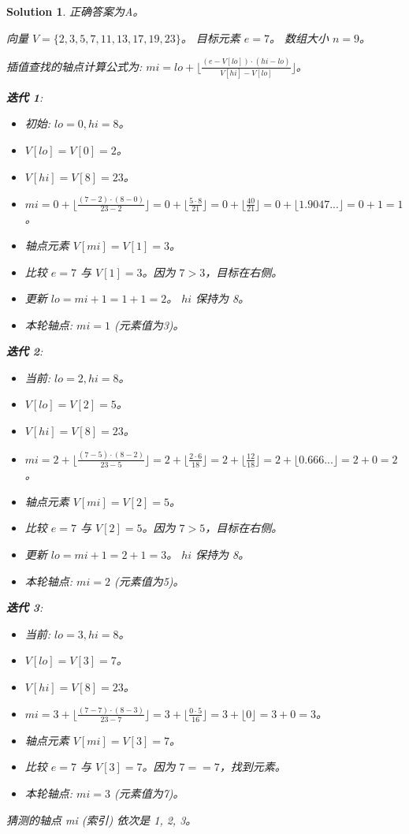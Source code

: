 \documentclass[UTF8]{report}
\newtheorem{solution}{Solution}
\theoremstyle{MyLineTheoremStyle} %
\theoremstyle{MyBlockTheoremStyle} %
\theoremstyle{MySubsubsectionStyle} %
\begin{document}
\begin{solution}
正确答案为A。

向量 $V = \{2, 3, 5, 7, 11, 13, 17, 19, 23\}$。
目标元素 $e = 7$。
数组大小 $n=9$。

插值查找的轴点计算公式为: $mi = lo + \lfloor \frac{(e - V[lo]) \cdot (hi - lo)}{V[hi] - V[lo]} \rfloor$。

\textbf{迭代 1}:
\begin{itemize}
    \item 初始: $lo = 0, hi = 8$。
    \item $V[lo] = V[0] = 2$。
    \item $V[hi] = V[8] = 23$。
    \item $mi = 0 + \lfloor \frac{(7 - 2) \cdot (8 - 0)}{23 - 2} \rfloor = 0 + \lfloor \frac{5 \cdot 8}{21} \rfloor = 0 + \lfloor \frac{40}{21} \rfloor = 0 + \lfloor 1.9047... \rfloor = 0 + 1 = 1$。
    \item 轴点元素 $V[mi] = V[1] = 3$。
    \item 比较 $e=7$ 与 $V[1]=3$。因为 $7 > 3$，目标在右侧。
    \item 更新 $lo = mi + 1 = 1 + 1 = 2$。 $hi$ 保持为 8。
    \item 本轮轴点: $mi=1$ (元素值为3)。
\end{itemize}

\textbf{迭代 2}:
\begin{itemize}
    \item 当前: $lo = 2, hi = 8$。
    \item $V[lo] = V[2] = 5$。
    \item $V[hi] = V[8] = 23$。
    \item $mi = 2 + \lfloor \frac{(7 - 5) \cdot (8 - 2)}{23 - 5} \rfloor = 2 + \lfloor \frac{2 \cdot 6}{18} \rfloor = 2 + \lfloor \frac{12}{18} \rfloor = 2 + \lfloor 0.666... \rfloor = 2 + 0 = 2$。
    \item 轴点元素 $V[mi] = V[2] = 5$。
    \item 比较 $e=7$ 与 $V[2]=5$。因为 $7 > 5$，目标在右侧。
    \item 更新 $lo = mi + 1 = 2 + 1 = 3$。 $hi$ 保持为 8。
    \item 本轮轴点: $mi=2$ (元素值为5)。
\end{itemize}

\textbf{迭代 3}:
\begin{itemize}
    \item 当前: $lo = 3, hi = 8$。
    \item $V[lo] = V[3] = 7$。
    \item $V[hi] = V[8] = 23$。
    \item $mi = 3 + \lfloor \frac{(7 - 7) \cdot (8 - 3)}{23 - 7} \rfloor = 3 + \lfloor \frac{0 \cdot 5}{16} \rfloor = 3 + \lfloor 0 \rfloor = 3 + 0 = 3$。
    \item 轴点元素 $V[mi] = V[3] = 7$。
    \item 比较 $e=7$ 与 $V[3]=7$。因为 $7 == 7$，找到元素。
    \item 本轮轴点: $mi=3$ (元素值为7)。
\end{itemize}
猜测的轴点 mi (索引) 依次是 1, 2, 3。

\end{solution}
\end{document}
